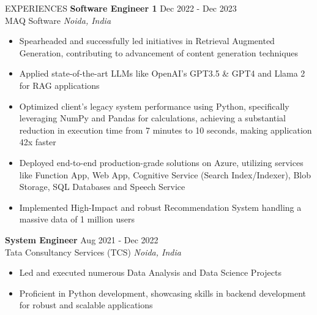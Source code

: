\documentclass{resume} %
\begin{document}
\begin{rSection}{EXPERIENCES}
\textbf{Software Engineer 1} \hfill Dec 2022 - Dec 2023\\
MAQ Software \hfill \textit{Noida, India}
\vspace{-6pt}
 \begin{itemize}
    \itemsep -6pt {}
     \item Spearheaded and successfully led initiatives in Retrieval Augmented Generation, contributing to advancement of content generation techniques
     \item Applied state-of-the-art LLMs like OpenAI’s GPT3.5 \& GPT4  and Llama 2 for RAG applications
     \item Optimized client’s legacy system performance using Python, specifically leveraging NumPy and Pandas for calculations, achieving a substantial reduction in execution time from 7 minutes to 10 seconds, making application 42x faster
     \item Deployed end-to-end production-grade solutions on Azure, utilizing services like Function App, Web App, Cognitive Service (Search Index/Indexer), Blob Storage, SQL Databases and Speech Service
     \item Implemented High-Impact and robust Recommendation System handling a massive data of 1 million users
\end{itemize}

\textbf{System Engineer} \hfill Aug 2021 - Dec 2022\\
Tata Consultancy Services (TCS) \hfill \textit{Noida, India}
\vspace{-6pt}
 \begin{itemize}
    \itemsep -6pt {} 
     \item Led and executed numerous Data Analysis and Data Science Projects
     \item Proficient in Python development, showcasing skills in backend development for robust and scalable applications
\end{itemize}

\end{rSection}
\end{document}
